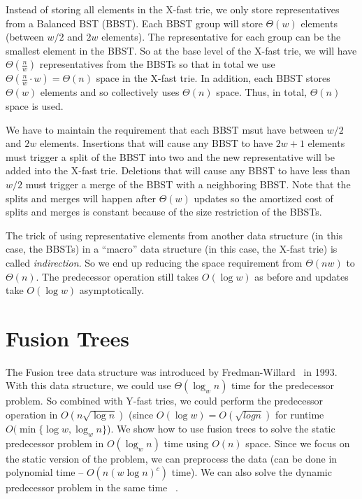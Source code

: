 \documentclass[11pt]{article}
\begin{document}
Instead of storing all elements in the X-fast trie, we only store
representatives from a Balanced BST (BBST). Each BBST group will store
$\Theta(w)$ elements (between $w/2$ and $2w$ elements). The
representative for each group can be the smallest element in the BBST.
So at the base level of the X-fast trie, we will have $\Theta(\frac{n}{w})$
representatives from the BBSTs so that in total we use
$\Theta(\frac{n}{w}\cdot w) = \Theta(n)$ space in the X-fast trie.
In addition, each BBST stores $\Theta(w)$ elements and so collectively
uses $\Theta(n)$ space. Thus, in total, $\Theta(n)$ space is used.

We have to maintain the requirement that each BBST msut have between
$w/2$ and $2w$ elements. Insertions that will cause any BBST to have
$2w+1$ elements must trigger a split of the BBST into two and the new
representative will be added into the X-fast trie. Deletions that will
cause any BBST to have less than $w/2$ must trigger a merge of the BBST
with a neighboring BBST. Note that the splits and merges will happen
after $\Theta(w)$ updates so the amortized cost of splits and merges is
constant because of the size restriction of the BBSTs.

The trick of using representative elements from another data structure
(in this case, the BBSTs)
in a ``macro'' data structure (in this case, the X-fast trie)
is called \textit{indirection}. So we end up reducing the space
requirement from $\Theta(nw)$ to $\Theta(n)$. The predecessor operation
still takes $O(\log w)$ as before and updates take $O(\log w)$
asymptotically.

\section{Fusion Trees}

The Fusion tree data structure was introduced by
Fredman-Willard~\cite{FredWill93} in 1993. With this data structure,
we could use $\Theta(\log_w n)$ time for the predecessor problem. So
combined with Y-fast tries, we could perform the predecessor operation
in $O(n\sqrt{\log n})$ (since $O(\log w) = O(\sqrt{log n})$ for
runtime $O(\min\{\log w, \log_w n\}$). We show how to use fusion trees
to solve the static predecessor problem in $O(\log_w n)$ time using
$O(n)$ space. Since we focus on the static version of the problem,
we can preprocess the data (can be done in polynomial time
-- $O(n(w\log n)^c)$ time).
We can also solve the
dynamic predecessor problem in the same time
~\cite{AnderThorup07, Raman96}.
\end{document}

